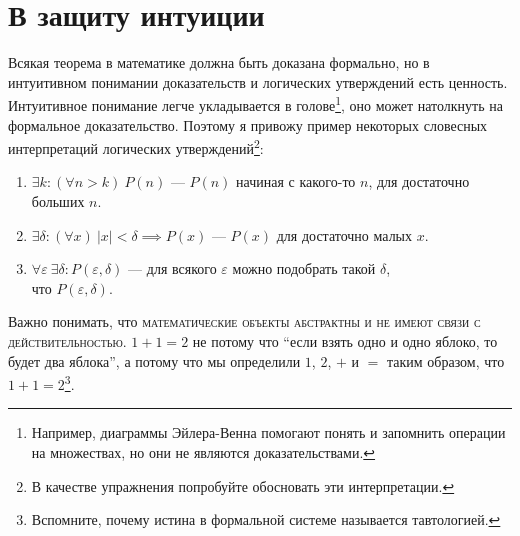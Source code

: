 % 
% 
% 
\part{В защиту интуиции}

Всякая теорема в математике должна быть доказана формально,
но в интуитивном понимании доказательств и логических утверждений есть ценность.
Интуитивное понимание легче укладывается в голове\footnote{Например, диаграммы
	Эйлера-Венна помогают понять и запомнить операции на множествах, но они
	не являются доказательствами.},
оно может натолкнуть на формальное доказательство. Поэтому я привожу пример
некоторых словесных интерпретаций логических утверждений\footnote{В качестве
	упражнения попробуйте обосновать эти интерпретации.}:
\begin{enumerate}
	\item{}$\exists k:(\forall n>k)~P(n)$ --- $P(n)$ начиная с какого-то $n$,
	для достаточно больших $n$.
	\item{}$\exists \delta:(\forall x)~|x|<\delta\implies P(x)$ --- $P(x)$ для
	достаточно малых $x$.
	\item{}$\forall \varepsilon~\exists \delta:P(\varepsilon,\delta)$ ---
	для всякого $\varepsilon$ можно подобрать такой $\delta$,\\что $P(\varepsilon,\delta)$.
\end{enumerate}

Важно понимать, что \textsc{математические объекты абстрактны
	и не имеют связи с действительностью.}
${1+1=2}$ не потому что ``если взять одно и одно яблоко, то будет два яблока'', а
потому что мы определили $1$, $2$, $+$ и $=$ таким образом, что $1+1=2$\footnote{
	Вспомните, почему истина в формальной системе называется тавтологией.
}.

